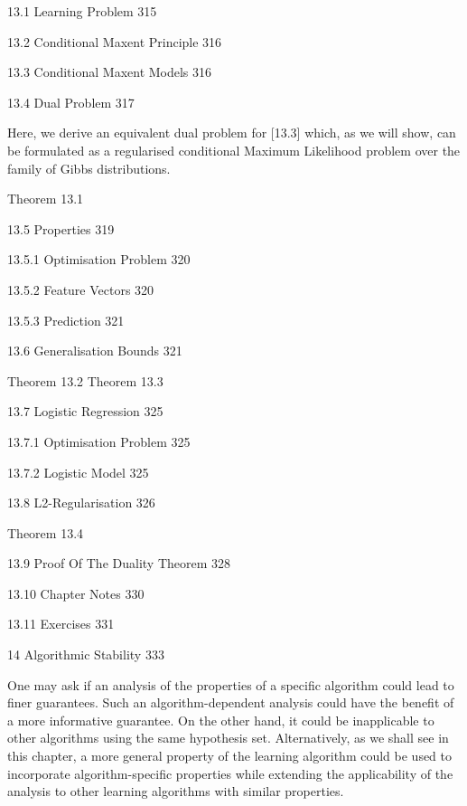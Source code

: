 13.1 Learning Problem 315



13.2 Conditional Maxent Principle 316



13.3 Conditional Maxent Models 316



13.4 Dual Problem 317

Here, we derive an equivalent dual problem for [13.3] which, as we will show, can be formulated as a regularised conditional Maximum Likelihood problem over the family of Gibbs distributions.

Theorem 13.1

13.5 Properties 319



13.5.1 Optimisation Problem 320



13.5.2 Feature Vectors 320



13.5.3 Prediction 321



13.6 Generalisation Bounds 321

Theorem 13.2
Theorem 13.3

13.7 Logistic Regression 325



13.7.1 Optimisation Problem 325



13.7.2 Logistic Model 325



13.8 L2-Regularisation 326

Theorem 13.4

13.9 Proof Of The Duality Theorem 328



13.10 Chapter Notes 330



13.11 Exercises 331



14 Algorithmic Stability 333

One may ask if an analysis of the properties of a specific algorithm could lead to finer guarantees. Such an algorithm-dependent analysis could have the benefit of a more informative guarantee. On the other hand, it could be inapplicable to other algorithms using the same hypothesis set. Alternatively, as we shall see in this chapter, a more general property of the learning algorithm could be used to incorporate algorithm-specific properties while extending the applicability of the analysis to other learning algorithms with similar properties.

